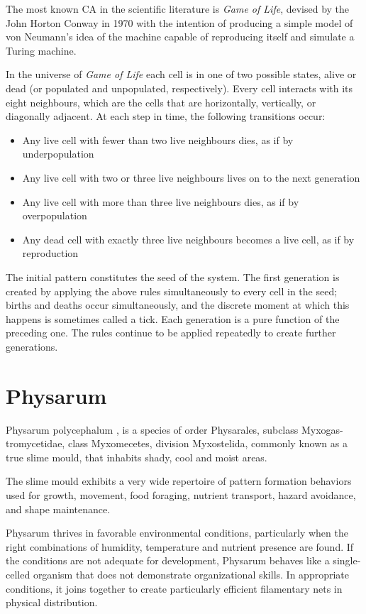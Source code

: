 \par
The most known CA in the scientific literature is \textit{Game of Life}, devised by the John Horton Conway in 1970 with the intention of producing a simple model of von Neumann's idea of the machine capable of reproducing itself and simulate a Turing machine. 
\par
In the universe of \textit{Game of Life} each cell is in one of two possible states, alive or dead (or populated and unpopulated, respectively). Every cell interacts with its eight neighbours, which are the cells that are horizontally, vertically, or diagonally adjacent. At each step in time, the following transitions occur:
\begin{itemize}
	\item Any live cell with fewer than two live neighbours dies, as if by underpopulation
	\item Any live cell with two or three live neighbours lives on to the next generation
	\item Any live cell with more than three live neighbours dies, as if by overpopulation
	\item Any dead cell with exactly three live neighbours becomes a live cell, as if by reproduction
\end{itemize}
\par
The initial pattern constitutes the seed of the system. The first generation is created by applying the above rules simultaneously to every cell in the seed; births and deaths occur simultaneously, and the discrete moment at which this happens is sometimes called a tick. Each generation is a pure function of the preceding one. The rules continue to be applied repeatedly to create further generations. 

\section{Physarum}
Physarum polycephalum \cite{sun2017physarum}, \cite{mayne2016biology} is a species of order Physarales, subclass Myxogas-tromycetidae, class Myxomecetes, division Myxostelida, commonly known as a true slime mould, that inhabits shady, cool and moist areas.
\par
The slime mould exhibits a very wide repertoire of pattern formation behaviors used for growth, movement, food foraging, nutrient transport, hazard avoidance, and shape maintenance. 
\par
Physarum thrives in favorable environmental conditions, particularly when the right combinations of humidity, temperature and nutrient presence are found. If the conditions are not adequate for development, Physarum behaves like a single-celled organism that does not demonstrate organizational skills. In appropriate conditions, it joins together to create particularly efficient filamentary nets in physical distribution.


